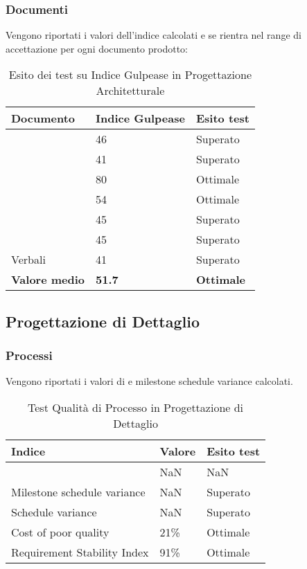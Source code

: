 \documentclass[12pt,a4paper]{article}
\begin{document}
\subsubsection{Documenti}
Vengono riportati i valori dell'indice  calcolati e se rientra nel range di accettazione per ogni documento prodotto:
\begin{table}[H]
	\begin{center}
		\begin{tabular}{p{} p{} p{}}
			\toprule
			\textbf{Documento}   & \textbf{Indice Gulpease}	& \textbf{Esito test} \\ \midrule
			\midrule
			\NdP & 46 &  Superato \\ \midrule
			\SdF & 41 &  Superato \\ \midrule
			\AdR & 80 &  Ottimale \\ \midrule
			\PdP & 54 &  Ottimale \\ \midrule
			\PdQ & 45 &  Superato \\ \midrule
			\DP & 45 &  Superato \\ \midrule
			Verbali & 41 &  Superato \\ \midrule\midrule
			\textbf{Valore medio} & \textbf{51.7}& \textbf{Ottimale}\\ 
			\bottomrule
		\end{tabular}
		\caption{Esito dei test su Indice Gulpease in Progettazione Architetturale}
	\end{center}
\end{table}
\subsection{Progettazione di Dettaglio}
\subsubsection{Processi}
Vengono riportati i valori di  e  milestone schedule variance calcolati. 

\begin{table}[H]
	\begin{center}
		\begin{tabular}{p{} p{} p{}}
			\toprule
			\textbf{Indice}   & \textbf{Valore}	& \textbf{Esito test} \\ \midrule
			\midrule
			\mgls{cost variance} & NaN &  NaN \\ \midrule
			Milestone schedule variance &  NaN & Superato\\ \midrule
			Schedule variance & NaN & Superato\\ \midrule
			Cost of poor quality & 21\% & Ottimale \\ \midrule
			Requirement Stability Index & 91\% & Ottimale\\ \bottomrule
			\end{tabular}	
		\end{center}
		\caption{Test Qualità di Processo in Progettazione di Dettaglio}
	\end{table}
			
\end{document}
